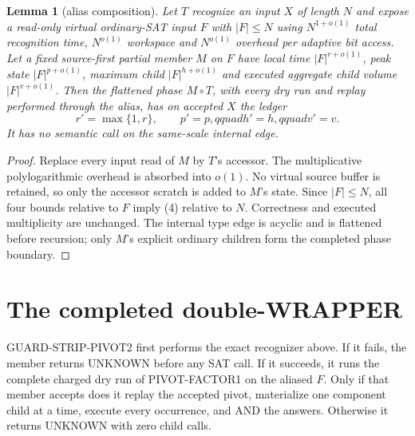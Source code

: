 \documentclass[11pt]{article}
\newtheorem{lemma}[theorem]{Lemma}
\begin{document}
\begin{lemma}[alias composition]\label{lem:alias}
Let $T$ recognize an input $X$ of length $N$ and expose a read-only virtual
ordinary-SAT input $F$ with $|F|\le N$ using $N^{1+o(1)}$ total recognition
time, $N^{o(1)}$ workspace and $N^{o(1)}$ overhead per adaptive bit access.
Let a fixed source-first partial member $M$ on $F$ have local time
$|F|^{r+o(1)}$, peak state $|F|^{p+o(1)}$, maximum child
$|F|^{h+o(1)}$ and executed aggregate child volume $|F|^{v+o(1)}$.
Then the flattened phase $M\circ T$, with every dry run and replay performed
through the alias, has on accepted $X$ the ledger
\begin{equation}
 r'=\max\{1,r\},\qquad p'=p,qquad h'=h,qquad v'=v.       \tag{4}
\end{equation}
It has no semantic call on the same-scale internal edge.
\end{lemma}
\begin{proof}
Replace every input read of $M$ by $T$'s accessor.  The multiplicative
polylogarithmic overhead is absorbed into $o(1)$.  No virtual source buffer
is retained, so only the accessor scratch is added to $M$'s state.  Since
$|F|\le N$, all four bounds relative to $F$ imply (4) relative to $N$.
Correctness and executed multiplicity are unchanged.  The internal type edge
is acyclic and is flattened before recursion; only $M$'s explicit ordinary
children form the completed phase boundary.
\end{proof}

\section{The completed double-WRAPPER}
\textsc{GUARD-STRIP-PIVOT2} first performs the exact recognizer above.  If it
fails, the member returns UNKNOWN before any SAT call.  If it succeeds, it
runs the complete charged dry run of \textsc{PIVOT-FACTOR1} on the aliased
$F$.  Only if that member accepts does it replay the accepted pivot,
materialize one component child at a time, execute every occurrence, and AND
the answers.  Otherwise it returns UNKNOWN with zero child calls.
\end{document}
